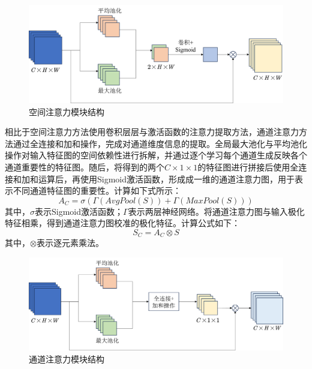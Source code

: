 \begin{figure}[ht!]
    \centering
    \includegraphics[width=14cm]{pic/chapter3/Spatial.png}
    \caption{空间注意力模块结构}
    \label{fig:spatial}
\end{figure}

相比于空间注意力方法使用卷积层层与激活函数的注意力提取方法，通道注意力方法通过全连接和加和操作，完成对通道维度信息的提取。全局最大池化与平均池化操作对输入特征图的空间依赖性进行拆解，并通过逐个学习每个通道生成反映各个通道重要性的特征图。随后，将得到的两个$C\times 1 \times 1$的特征图进行拼接后使用全连接和加和运算后，再使用Sigmoid激活函数，形成成一维的通道注意力图，用于表示不同通道特征图的重要性。计算如下式所示：
\begin{equation}
    A_C=\sigma(\Gamma(AvgPool(S))+\Gamma(MaxPool(S)))
\end{equation}
其中，$\sigma$表示Sigmoid激活函数；$\Gamma$表示两层神经网络。将通道注意力图与输入极化特征相乘，得到通道注意力图校准的极化特征。计算公式如下：
\begin{equation}
    S_C=A_C \otimes S
\end{equation}
其中，$\otimes$表示逐元素乘法。

\begin{figure}[ht!]
    \centering
    \includegraphics[width=14cm]{pic/chapter3/Channel.png}
    \caption{通道注意力模块结构}
    \label{fig:channel}
\end{figure}



